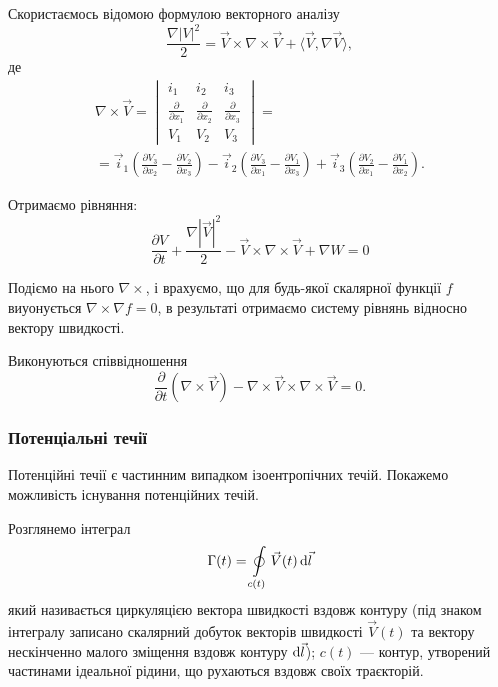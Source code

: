 Скористаємось відомою формулою векторного аналізу
\begin{equation}
	\frac{\nabla |V|^2}{2} = \vec V \times \nabla \times \vec V + \langle \vec V, \nabla \vec V \rangle,
\end{equation}
де
\begin{multline}
	\nabla \times \vec V = 
	\begin{vmatrix} 
		i_1 & i_2 & i_3 \\
		\frac{\partial}{\partial x_1} & \frac{\partial}{\partial x_2} & \frac{\partial}{\partial x_3} \\
		V_1 & V_2 & V_3
	\end{vmatrix} = \\
	= \vec i_1 \left( \frac{\partial V_3}{\partial x_2} - \frac{\partial V_2}{\partial x_3} \right) - \vec i_2 \left( \frac{\partial V_3}{\partial x_1} - \frac{\partial V_1}{\partial x_3} \right) + \vec i_3 \left( \frac{\partial V_2}{\partial x_1} - \frac{\partial V_1}{\partial x_2} \right).
\end{multline}

Отримаємо рівняння:
\begin{equation}
	\label{eq:3.3.64}
	\frac{\partial V}{\partial t} + \frac{\nabla \left| \vec V\right|^2}{2} - \vec V \times \nabla \times \vec V + \nabla W = 0
\end{equation}

Подіємо на нього $\nabla \times$, і врахуємо, що для будь-якої скалярної функції $f$ виуонується $\nabla \times \nabla f = 0$, в результаті отримаємо систему рівнянь відносно вектору швидкості.

\begin{th_equation}
	Виконуються співвідношення
	\begin{equation}
		\frac{\partial}{\partial t} \left(\nabla \times \vec V\right) - \nabla \times \vec V \times \nabla \times \vec V = 0.
	\end{equation}
\end{th_equation}

\subsubsection{Потенціальні течії}

Потенційні течії є частинним випадком ізоентропічних течій. Покажемо можливість існування потенційних течій. \medskip

Розглянемо інтеграл	
\begin{equation}
	\Gamma(t) = \displaystyle\oint\limits_{c(t)} \vec V(t) \mathop{}\!\mathrm{d} \vec l
\end{equation}
який називається циркуляцією вектора швидкості вздовж контуру (під знаком інтегралу записано скалярний добуток векторів швидкості $\vec V(t)$ та вектору нескінченно малого зміщення вздовж контуру $\mathop{}\!\mathrm{d} \vec l$); $c(t)$ --- контур, утворений частинами ідеальної рідини, що рухаються вздовж своїх траєкторій. \medskip

